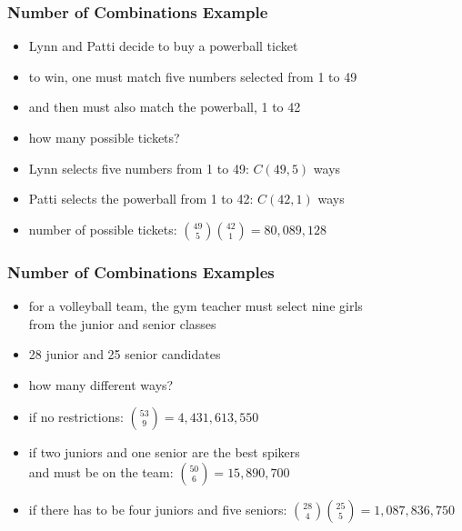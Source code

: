 \documentclass[dvipsnames]{beamer}
\begin{document}
\begin{frame}
  \frametitle{Number of Combinations Example}

  \begin{itemize}
    \item Lynn and Patti decide to buy a powerball ticket
    \item to win, one must match five numbers selected from 1 to 49
    \item and then must also match the powerball, 1 to 42
    \item how many possible tickets?

    \pause
    \medskip
    \item Lynn selects five numbers from 1 to 49: $C(49,5)$ ways
    \item Patti selects the powerball from 1 to 42: $C(42,1)$ ways
    \item number of possible tickets:
      ${49 \choose 5}{42 \choose 1} = 80,089,128$
  \end{itemize}
\end{frame}

\begin{frame}
  \frametitle{Number of Combinations Examples}

  \begin{itemize}
    \item for a volleyball team, the gym teacher must select nine girls\\
      from the junior and senior classes
    \item 28 junior and 25 senior candidates
    \item how many different ways?

    \pause
    \medskip
    \item if no restrictions: ${53 \choose 9} = 4,431,613,550$
    \pause
    \item if two juniors and one senior are the best spikers\\
      and must be on the team: ${50 \choose 6} = 15,890,700$
    \pause
    \item if there has to be four juniors and five seniors:
      ${28 \choose 4}{25 \choose 5} = 1,087,836,750$
  \end{itemize}
\end{frame}
\end{document}
